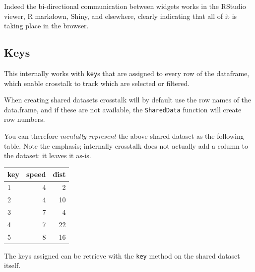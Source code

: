 \documentclass[10pt,]{krantz}
\makeatletter
\newenvironment{Shaded}{\begin{snugshade}}{\end{snugshade}}
\newcommand{\CommentTok}[1]{\textcolor[rgb]{0.37,0.37,0.37}{\textit{#1}}}
\newcommand{\DecValTok}[1]{\textcolor[rgb]{0.06,0.06,0.06}{#1}}
\newcommand{\KeywordTok}[1]{\textcolor[rgb]{0.27,0.27,0.27}{\textbf{#1}}}
\newcommand{\NormalTok}[1]{#1}
\newcommand{\OperatorTok}[1]{\textcolor[rgb]{0.43,0.43,0.43}{\textbf{#1}}}
\newcommand{\StringTok}[1]{\textcolor[rgb]{0.5,0.5,0.5}{#1}}
\newenvironment{kframe}{%
\medskip{}
\setlength{\fboxsep}{.8em}
 \def\at@end@of@kframe{}%
 \ifinner\ifhmode%
  \def\at@end@of@kframe{\end{minipage}}%
  \begin{minipage}{\columnwidth}%
 \fi\fi%
 \def\FrameCommand##1{\hskip\@totalleftmargin \hskip-\fboxsep
 \colorbox{shadecolor}{##1}\hskip-\fboxsep
     \hskip-\linewidth \hskip-\@totalleftmargin \hskip\columnwidth}%
 \MakeFramed {\advance\hsize-\width
   \@totalleftmargin\z@ \linewidth\hsize
   \@setminipage}}%
 {\par\unskip\endMakeFramed%
 \at@end@of@kframe}
\renewenvironment{Shaded}{\begin{kframe}}{\end{kframe}}
\makeatother
\begin{document}
Indeed the bi-directional communication between widgets works in the RStudio viewer, R markdown, Shiny, and elsewhere, clearly indicating that all of it is taking place in the browser.

\hypertarget{linking-widgets-keys}{%
\subsection{Keys}\label{linking-widgets-keys}}

This internally works with \texttt{key}s that are assigned to every row of the dataframe, which enable crosstalk to track which are selected or filtered.

When creating shared datasets crosstalk will by default use the row names of the data.frame, and if these are not available, the \texttt{SharedData} function will create row numbers.

\begin{Shaded}
\end{Shaded}

You can therefore \emph{mentally represent} the above-shared dataset as the following table. Note the emphasis; internally crosstalk does not actually add a column to the dataset: it leaves it as-is.

\begin{tabular}{l|r|r}
\hline
key & speed & dist\\
\hline
1 & 4 & 2\\
\hline
2 & 4 & 10\\
\hline
3 & 7 & 4\\
\hline
4 & 7 & 22\\
\hline
5 & 8 & 16\\
\hline
\end{tabular}

The keys assigned can be retrieve with the \texttt{key} method on the shared dataset itself.

\begin{Shaded}
\end{Shaded}
\end{document}
